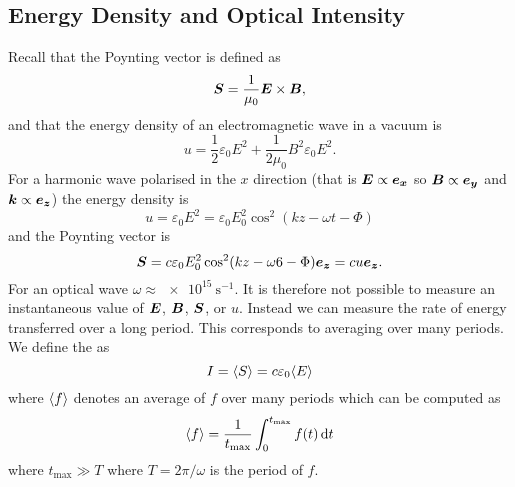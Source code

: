     \subsection{Energy Density and Optical Intensity}
    Recall that the Poynting vector is defined as
    \[\bm{S} = \frac{1}{\mu_0}\bm{E}\times\bm{B},\]
    and that the energy density of an electromagnetic wave in a vacuum is
    \[u = \frac{1}{2}\varepsilon_0E^2 + \frac{1}{2\mu_0}B^2 \varepsilon_0E^2.\]
    For a harmonic wave polarised in the \(x\) direction (that is \(\bm{E}\propto\bm{e_{x}}\) so \(\bm{B}\propto\bm{e_{y}}\) and \(\bm{k}\propto\bm{e_{z}}\)) the energy density is
    \[u = \varepsilon_0E^2 = \varepsilon_0 E_0^2\cos^2(kz - \omega t - \Phi)\]
    and the Poynting vector is
    \[\bm{S} = c\varepsilon_0E_0^2\cos^2(kz - \omega 6 - \Phi)\bm{e_{z}} = cu\bm{e_{z}}.\]
    For an optical wave \(\omega \approx \SI{e15}{\second^{-1}}\).
    It is therefore not possible to measure an instantaneous value of \(\bm{E}\), \(\bm{B}\), \(\bm{S}\), or \(u\).
    Instead we can measure the rate of energy transferred over a long period.
    This corresponds to averaging over many periods.
    We define the  as
    \[I = \langle{S}\rangle = c\varepsilon_0\langle{E}\rangle\]
    where \(\langle{f}\rangle\) denotes an average of \(f\) over many periods which can be computed as
    \[\langle{f}\rangle = \frac{1}{t_{\max}} \int_0^{t_{\max}}f(t)\dd{t}\]
    where \(t_{\max}\gg T\) where \(T = 2\pi/\omega\) is the period of \(f\).
    
